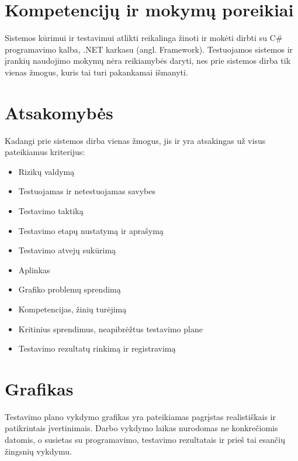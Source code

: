 \section{Kompetencijų ir mokymų poreikiai}

Sistemos kūrimui ir testavimui atlikti reikalinga žinoti ir mokėti dirbti su C\# programavimo kalba, .NET karkasu (angl. Framework). 
Testuojamos sistemos ir įrankių naudojimo mokymų nėra reikiamybės daryti, nes prie sistemos dirba tik vienas žmogus, kuris tai turi pakankamai išmanyti.

\section{Atsakomybės}

Kadangi prie sistemos dirba vienas žmogus, jis ir yra atsakingas už visus pateikiamus kriterijus: 

\begin{itemize}
	\item Rizikų valdymą
	\item Testuojamas ir netestuojamas savybes
	\item Testavimo taktiką
	\item Testavimo etapų nustatymą ir aprašymą
	\item Testavimo atvejų sukūrimą
	\item Aplinkas
	\item Grafiko problemų sprendimą
	\item Kompetencijas, žinių turėjimą
	\item Kritinius sprendimus, neapibrėžtus testavimo plane
	\item Testavimo rezultatų rinkimą ir registravimą
\end{itemize}

\section{Grafikas}

Testavimo plano vykdymo grafikas yra pateikiamas pagrįstas realistiškais ir patikrintais įvertinimais.
Darbo vykdymo laikas nurodomas ne konkrečiomis datomis, o susietas su programavimo, testavimo rezultatais ir prieš tai esančių žingsnių vykdymu.

